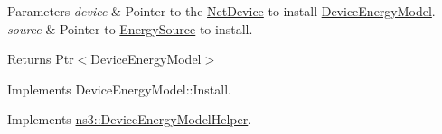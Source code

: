 \begin{DoxyParams}{Parameters}
{\em device} & Pointer to the \hyperlink{classns3_1_1NetDevice}{Net\+Device} to install \hyperlink{classns3_1_1DeviceEnergyModel}{Device\+Energy\+Model}. \\
\hline
{\em source} & Pointer to \hyperlink{classns3_1_1EnergySource}{Energy\+Source} to install. \\
\hline
\end{DoxyParams}
\begin{DoxyReturn}{Returns}
Ptr$<$\+Device\+Energy\+Model$>$
\end{DoxyReturn}
Implements Device\+Energy\+Model\+::\+Install. 

Implements \hyperlink{classns3_1_1DeviceEnergyModelHelper_aec55d17a850dd0f266e24200df20537f}{ns3\+::\+Device\+Energy\+Model\+Helper}.


